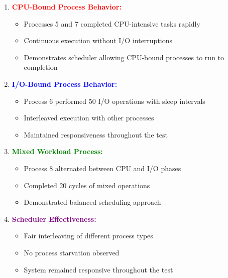 \documentclass[a4paper,12pt]{report}
\begin{document}
\begin{tcolorbox}[colback=yellow!5, colframe=orange!60, title=\textbf{Key Observations from Real Output}]
\begin{enumerate}
\item \textbf{\textcolor{red}{CPU-Bound Process Behavior:}}
   \begin{itemize}
   \item Processes 5 and 7 completed CPU-intensive tasks rapidly
   \item Continuous execution without I/O interruptions
   \item Demonstrates scheduler allowing CPU-bound processes to run to completion
   \end{itemize}

\item \textbf{\textcolor{blue}{I/O-Bound Process Behavior:}}
   \begin{itemize}
   \item Process 6 performed 50 I/O operations with sleep intervals
   \item Interleaved execution with other processes
   \item Maintained responsiveness throughout the test
   \end{itemize}

\item \textbf{\textcolor{green}{Mixed Workload Process:}}
   \begin{itemize}
   \item Process 8 alternated between CPU and I/O phases
   \item Completed 20 cycles of mixed operations
   \item Demonstrated balanced scheduling approach
   \end{itemize}

\item \textbf{\textcolor{purple}{Scheduler Effectiveness:}}
   \begin{itemize}
   \item Fair interleaving of different process types
   \item No process starvation observed
   \item System remained responsive throughout the test
   \end{itemize}
\end{enumerate}
\end{tcolorbox}
\end{document}
